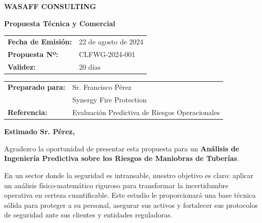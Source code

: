 \documentclass[a4paper,12pt]{article}
\begin{document}
\begin{titlepage}
    \centering
    \vspace*{1cm}
    
    {\scshape\huge \textbf{WASAFF CONSULTING}}
    \par\vspace{0.5cm}
    
    {\Large \textbf{Propuesta Técnica y Comercial}}
    \par\vspace{1cm}
    
    \color{dark_gray}{\rule{\linewidth}{1pt}}
    \par\vspace{0.7cm}
    
    \begin{tabular}{ll}
        \textbf{Fecha de Emisión:} & 22 de agosto de 2024 \\
        \textbf{Propuesta Nº:} & CLFWG-2024-001 \\
        \textbf{Validez:} & 20 días \\
    \end{tabular}
    
    \par\vspace{1cm}
    
    \color{dark_gray}{\rule{\linewidth}{0.4pt}}
    \par\vspace{0.4cm}
    \begin{tabular}{ll}
        \textbf{Preparado para:} & Sr. Francisco Pérez \\
        & Synergy Fire Protection \\
        \textbf{Referencia:} & Evaluación Predictiva de Riesgos Operacionales \\
    \end{tabular}
    \color{dark_gray}{\rule{\linewidth}{0.4pt}}
    
    \vfill 
    
    \begin{flushleft}
        \textbf{Estimado Sr. Pérez,}
        \vspace{0.5cm}
        
        Agradezco la oportunidad de presentar esta propuesta para un \textbf{Análisis de Ingeniería Predictiva sobre los Riesgos de Maniobras de Tuberías}.
        
        En un sector donde la seguridad es intransable, nuestro objetivo es claro: aplicar un análisis físico-matemático riguroso para transformar la incertidumbre operativa en certeza cuantificable. Este estudio le proporcionará una base técnica sólida para proteger a su personal, asegurar sus activos y fortalecer sus protocolos de seguridad ante sus clientes y entidades reguladoras.
        
    \end{flushleft}
\end{titlepage}
\end{document}
